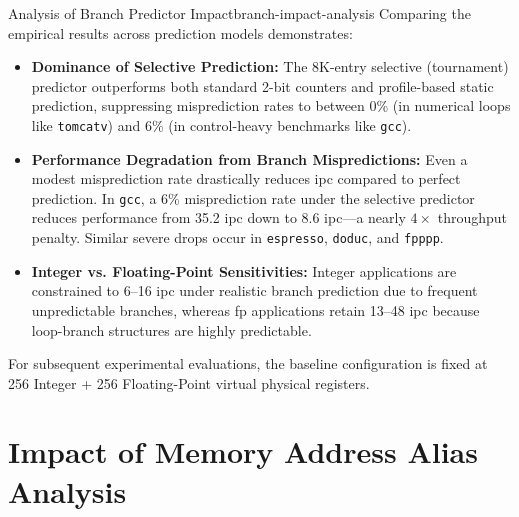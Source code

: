 \begin{observation}{Analysis of Branch Predictor Impact}{branch-impact-analysis}
Comparing the empirical results across prediction models demonstrates:
\begin{itemize}
    \item \textbf{Dominance of Selective Prediction:} The 8K-entry selective (tournament) predictor outperforms both standard 2-bit counters and profile-based static prediction, suppressing misprediction rates to between 0\% (in numerical loops like \texttt{tomcatv}) and 6\% (in control-heavy benchmarks like \texttt{gcc}).
    \item \textbf{Performance Degradation from Branch Mispredictions:} Even a modest misprediction rate drastically reduces \gls{ipc} compared to perfect prediction. In \texttt{gcc}, a 6\% misprediction rate under the selective predictor reduces performance from 35.2 \gls{ipc} down to 8.6 \gls{ipc}—a nearly $4\times$ throughput penalty. Similar severe drops occur in \texttt{espresso}, \texttt{doduc}, and \texttt{fpppp}.
    \item \textbf{Integer vs. Floating-Point Sensitivities:} Integer applications are constrained to 6--16 \gls{ipc} under realistic branch prediction due to frequent unpredictable branches, whereas \gls{fp} applications retain 13--48 \gls{ipc} because loop-branch structures are highly predictable.
\end{itemize}
\end{observation}

For subsequent experimental evaluations, the baseline configuration is fixed at 256 Integer + 256 Floating-Point virtual physical registers.

\section{Impact of Memory Address Alias Analysis}
\label{sec:memory_alias_impact}

